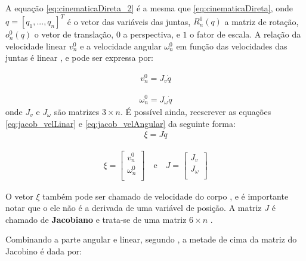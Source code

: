 A equação \ref{eq:cinematicaDireta_2} é a mesma que \ref{eq:cinematicaDireta}, onde $q = [q_1,...,q_n]^T$ é o vetor das 
variáveis das juntas, $R^{0}_n(q)$ a matriz de rotação, $o^{0}_n(q)$ o vetor de translação, $0$ a perspectiva, e $1$ o 
fator de escala. A relação da velocidade linear $v^0_n$ e a velocidade angular $\omega^0_n$ em função das velocidades 
das juntas é linear \cite{siciliano}, e pode ser expressa por:

\begin{equation}
  \begin{gathered}
    v^0_n = J_v \dot{q}
  \end{gathered}
  \label{eq:jacob_velLinar}
\end{equation}

\begin{equation}
  \begin{gathered}
    \omega^0_n = J_\omega \dot{q}
  \end{gathered}
  \label{eq:jacob_velAngular}
\end{equation}
onde $J_v$ e $J_\omega$ são matrizes $3 \times n$. É possível ainda, reescrever as equações \ref{eq:jacob_velLinar} e
\ref{eq:jacob_velAngular} da seguinte forma:
\begin{equation}
  \begin{gathered}
    \xi = J\dot{q}
  \end{gathered}
  \label{eq:jacob_ambos}
\end{equation}

\begin{equation}
  \begin{gathered}
    \xi = \begin{bmatrix}
     v^0_n\\
     \omega^0_n\\
    \end{bmatrix}
    \quad \textrm{e} \quad 
    J = \begin{bmatrix}
     J_v\\
     J_\omega\\
    \end{bmatrix}
  \end{gathered}
\end{equation}

O vetor $\xi$ também pode ser chamado de velocidade do corpo \cite{Spong}, e é importante notar que
o ele não é a derivada de uma variável de posição. A matriz $J$ é chamado de \textbf{Jacobiano} e trata-se
de uma matriz $6 \times n$ .

Combinando a parte angular e linear, segundo , a metade de cima da matriz do Jacobino é
dada por:

